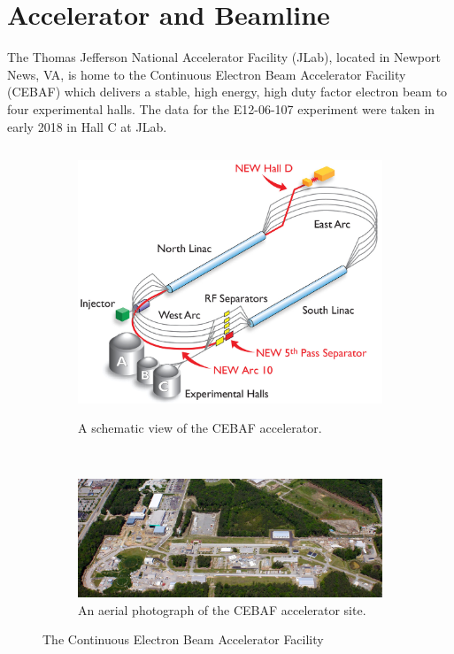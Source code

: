 \section{Accelerator and Beamline}
The Thomas Jefferson National Accelerator Facility (JLab), located in
Newport News, VA, is home to the Continuous Electron Beam Accelerator Facility
(CEBAF) which delivers a stable, high energy, high duty factor electron beam
to four experimental halls.
The data for the E12-06-107 experiment were taken in early 2018 in Hall C at
JLab.

\begin{figure}[ht]
    \centering
    \begin{subfigure}[b]{0.9\textwidth}
        \centering
        \includegraphics[height=8cm]{chap3/CEBAF_cartoon.jpg}
        \caption{A schematic view of the CEBAF accelerator.}
        \label{fig:CEBAF_cartoon}
    \end{subfigure}
    \vspace{0.1cm}
    \\
    \begin{subfigure}[b]{0.9\textwidth}
        \centering
        \includegraphics[width=\textwidth]{chap3/CEBAF_aerial_horizontal.jpg}
        \caption{An aerial photograph of the CEBAF accelerator site.}
        \label{fig:CEBAF_aerial}
    \end{subfigure}
    \caption{The Continuous Electron Beam Accelerator Facility}
    \label{fig:CEBAF}
\end{figure}


